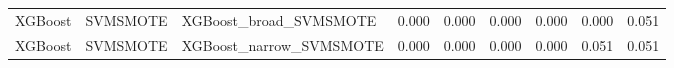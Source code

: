 \begin{tabular}{lllllllll}
                     XGBoost &            SVMSMOTE &                       XGBoost\_broad\_SVMSMOTE & 0.000 &                     0.000 &                 0.000 &                  0.000 &                                   0.000 &     0.051 \\
                     XGBoost &            SVMSMOTE &                      XGBoost\_narrow\_SVMSMOTE & 0.000 &                     0.000 &                 0.000 &                  0.000 &                                   0.051 &     0.051 \\
\bottomrule
\end{tabular}
